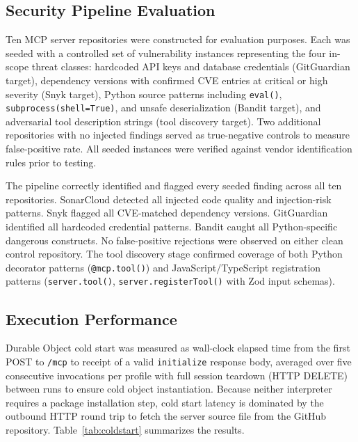 \documentclass[conference]{IEEEtran}
\begin{document}
\subsection{Security Pipeline Evaluation}

Ten MCP server repositories were constructed for evaluation purposes.
Each was seeded with a controlled set of vulnerability instances
representing the four in-scope threat classes: hardcoded API keys and
database credentials (GitGuardian target), dependency versions with
confirmed CVE entries at critical or high severity (Snyk target),
Python source patterns including \texttt{eval()},
\texttt{subprocess(shell=True)}, and unsafe deserialization (Bandit
target), and adversarial tool description strings (tool discovery
target).
Two additional repositories with no injected findings served as
true-negative controls to measure false-positive rate.
All seeded instances were verified against vendor identification rules
prior to testing.

The pipeline correctly identified and flagged every seeded finding
across all ten repositories.
SonarCloud detected all injected code quality and injection-risk
patterns.
Snyk flagged all CVE-matched dependency versions.
GitGuardian identified all hardcoded credential patterns.
Bandit caught all Python-specific dangerous constructs.
No false-positive rejections were observed on either clean control
repository.
The tool discovery stage confirmed coverage of both Python decorator
patterns (\texttt{@mcp.tool()}) and JavaScript/TypeScript registration
patterns (\texttt{server.tool()}, \texttt{server.registerTool()} with Zod
input schemas).

\subsection{Execution Performance}

Durable Object cold start was measured as wall-clock elapsed time from
the first POST to \texttt{/mcp} to receipt of a valid
\texttt{initialize} response body, averaged over five consecutive
invocations per profile with full session teardown (HTTP DELETE) between
runs to ensure cold object instantiation.
Because neither interpreter requires a package installation step, cold
start latency is dominated by the outbound HTTP round trip to fetch the
server source file from the GitHub repository.
Table~\ref{tab:coldstart} summarizes the results.
\end{document}
